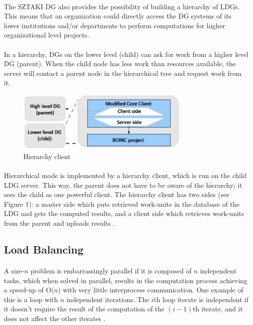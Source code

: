 \documentclass[10pt, twocolumn, letterpaper]{article}
\begin{document}
\paragraph{}
The SZTAKI DG also provides the possibility of building a hierarchy of LDGs. This means that an organization could directly access the DG systems of its lower institutions and/or departments to perform computations for higher organizational level projects.

\paragraph{}
In a hierarchy, DGs on the lower level (child) can ask for work from a higher level DG (parent). When the child node has less work than resources available, the server will contact a parent node in the hierarchical tree and request work from it.

\begin{figure}[h]
\begin{center}  
  \includegraphics[height=30mm]{SZTAKI_LDG.jpg}
  \caption{Hierarchy client \cite{balaton}}
\end{center}
\end{figure}

\paragraph{}
Hierarchical mode is implemented by a hierarchy client, which is run on the child LDG server. This way, the parent does not have to be aware of the hierarchy; it sees the child as one powerful client. The hierarchy client has two sides (see Figure 1): a master side which puts retrieved work-units in the database of the LDG and gets the computed results, and a client side which retrieves work-units from the parent and uploads results \cite{balaton}.

\subsection{Load Balancing}

\paragraph{}
A size-$n$ problem is embarrassingly parallel if it is composed of $n$ independent tasks, which when solved in parallel, results in the computation process achieving a speed-up of O($n$) with very little interprocess communication. One example of this is a loop with $n$ independent iterations. The $i$th loop iterate is independent if it doesn't require the result of the computation of the $(i-1)$th iterate, and it does not affect the other iterates \cite{pabico}.
\end{document}
